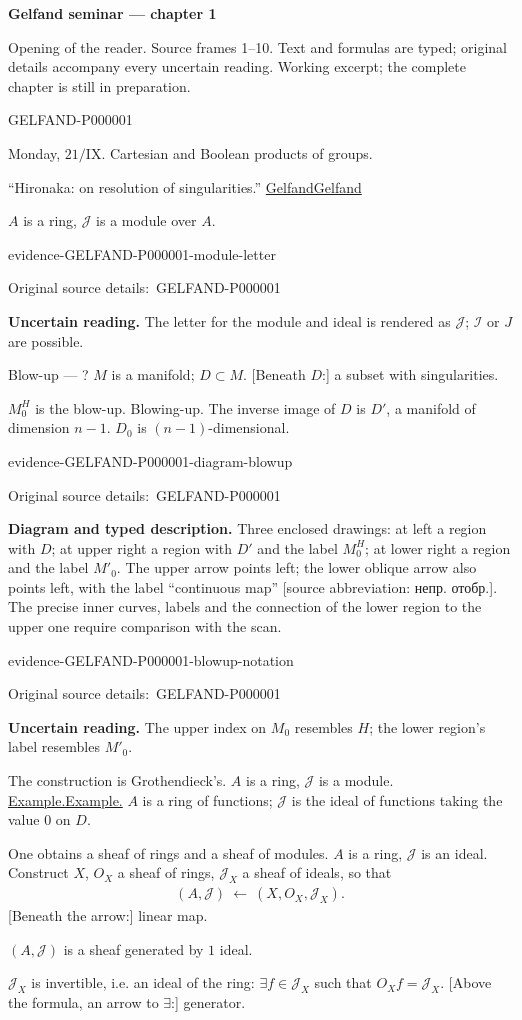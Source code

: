 \documentclass[11pt]{article}
\let\MathUnderline\underline
\renewcommand{\underline}[1]{\ifmmode\MathUnderline{#1}\else\uline{#1}\fi}
\newcommand{\SourcePage}[2]{\par\smallskip\phantomsection\label{#1:source-page}{\small\sffamily\color{blue!55!black}#1}\par\smallskip}
\newcommand{\EvidenceBlock}[4]{%
 \par\smallskip\noindent\begin{minipage}{\linewidth}
 \begin{minipage}[t]{.47\linewidth}\vspace{0pt}\centering
 \csname evidence-#1-#2\endcsname\par
 {\scriptsize\SourceCropCaption\ #1}\par
 \end{minipage}\hfill
 \begin{minipage}[t]{.49\linewidth}\vspace{0pt}\raggedright
 {\small\color{orange!65!black}\textbf{#4} #3}\par
 \end{minipage}
 \end{minipage}\par\smallskip}
\newcommand{\Unclear}[3]{\EvidenceBlock{#1}{#2}{#3}{\ReadingCaption}}
\newcommand{\SourceFigure}[3]{\EvidenceBlock{#1}{#2}{#3}{\DiagramCaption}}
\newcommand{\SourceCropCaption}{Original source details:}\newcommand{\ReadingCaption}{Uncertain reading.}\newcommand{\IncompleteCaption}{Undeciphered passage.}\newcommand{\DiagramCaption}{Diagram and typed description.}
\begin{document}
{\large\bfseries Gelfand seminar — chapter 1}\par
{\small Opening of the reader. Source frames 1–10. Text and formulas are typed; original details accompany every uncertain reading. Working excerpt; the complete chapter is still in preparation.}\par\medskip
\SourcePage{GELFAND-P000001}{unlabelled}
Monday, $21/\mathrm{IX}$.
Cartesian and Boolean products of groups.

``Hironaka: on resolution of singularities.''
\underline{Gelfand}

$A$ is a ring, $\mathcal{J}$ is a module over $A$.
\Unclear{GELFAND-P000001}{module-letter}{The letter for the module and ideal is rendered as $\mathcal{J}$; $\mathcal{I}$ or $J$ are possible.}

Blow-up --- ?
$M$ is a manifold; $D\subset M$.
[Beneath $D$:] a subset with singularities.

$M_0^H$ is the blow-up. Blowing-up.
The inverse image of $D$ is $D'$, a manifold of dimension $n-1$.
$D_0$ is $(n-1)$-dimensional.
\SourceFigure{GELFAND-P000001}{diagram-blowup}{Three enclosed drawings: at left a region with $D$; at upper right a region with $D'$ and the label $M_0^H$; at lower right a region and the label $M'_0$. The upper arrow points left; the lower oblique arrow also points left, with the label ``continuous map'' [source abbreviation: непр. отобр.]. The precise inner curves, labels and the connection of the lower region to the upper one require comparison with the scan.}
\Unclear{GELFAND-P000001}{blowup-notation}{The upper index on $M_0$ resembles $H$; the lower region's label resembles $M'_0$.}

The construction is Grothendieck's.
$A$ is a ring, $\mathcal{J}$ is a module.
\underline{Example.} $A$ is a ring of functions;
$\mathcal{J}$ is the ideal of functions taking the value $0$ on $D$.

One obtains a sheaf of rings and a sheaf of modules.
$A$ is a ring, $\mathcal{J}$ is an ideal.
Construct $X$, $O_X$ a sheaf of rings,
$\mathcal{J}_X$ a sheaf of ideals, so that
\begin{gather*}
 (A,\mathcal{J})\ \longleftarrow\ (X,O_X,\mathcal{J}_X).
\end{gather*}
[Beneath the arrow:] linear map.

$(A,\mathcal{J})$ is a sheaf generated by $1$ ideal.

$\mathcal{J}_X$ is invertible, i.e. an ideal of the ring:
$\exists f\in\mathcal{J}_X$ such that $O_Xf=\mathcal{J}_X$.
[Above the formula, an arrow to $\exists$:] generator.
\end{document}

